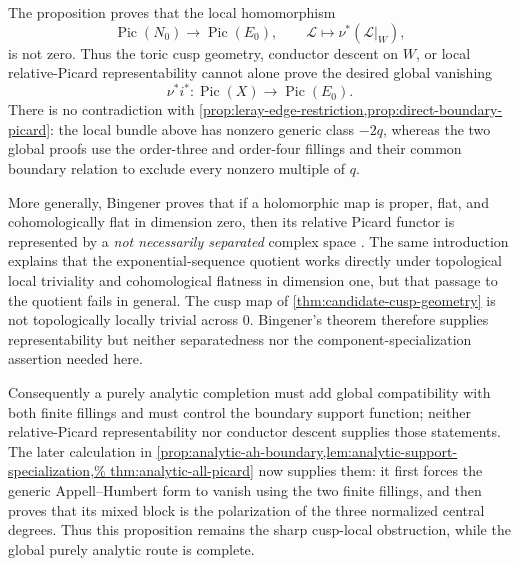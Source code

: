 \begin{remark}
\label{rem:local-cusp-picard-obstruction}
The proposition proves that the local homomorphism
\[
 \operatorname{Pic}(N_0)\longrightarrow\operatorname{Pic}(E_0),
 \qquad
 \mathcal L\longmapsto\nu^*(\mathcal L|_W),
\]
is not zero.  Thus the toric cusp geometry, conductor descent on \(W\),
or local relative-Picard representability cannot alone prove the desired
global vanishing
\[
 \nu^*i^*:\operatorname{Pic}(X)\longrightarrow
 \operatorname{Pic}(E_0).
\]
There is no contradiction with
\cref{prop:leray-edge-restriction,prop:direct-boundary-picard}: the local
bundle above has nonzero generic class \(-2q\), whereas the two global
proofs use the order-three and order-four fillings and their common
boundary relation to exclude every nonzero multiple of \(q\).

More generally, Bingener proves that if a holomorphic map is proper,
flat, and cohomologically flat in dimension zero, then its relative
Picard functor is represented by a \emph{not necessarily separated}
complex space
\cite[Introduction, p.~318; Satz~6.2, pp.~336--337]{Bingener1980}.
The same introduction explains that the exponential-sequence quotient
works directly under topological local triviality and cohomological
flatness in dimension one, but that passage to the quotient fails in
general.  The cusp map of \cref{thm:candidate-cusp-geometry} is not
topologically locally trivial across \(0\).  Bingener's theorem therefore
supplies representability but neither separatedness nor the
component-specialization assertion needed here.

Consequently a purely analytic completion must add global compatibility
with both finite fillings and must control the boundary support function;
neither relative-Picard representability nor conductor descent supplies
those statements.  The later calculation in
\cref{prop:analytic-ah-boundary,lem:analytic-support-specialization,%
thm:analytic-all-picard} now supplies them: it first forces the generic
Appell--Humbert form to vanish using the two finite fillings, and then
proves that its mixed block is the polarization of the three normalized
central degrees.  Thus this proposition remains the sharp cusp-local
obstruction, while the global purely analytic route is complete.
\end{remark}
